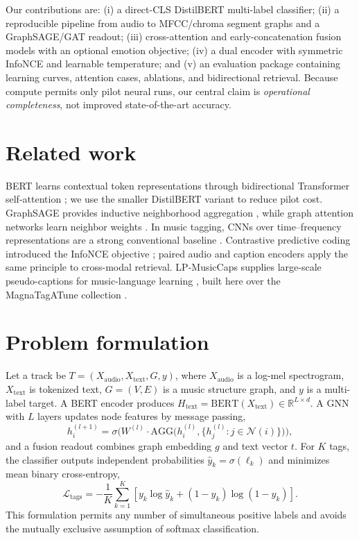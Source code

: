 \documentclass{article}
\begin{document}
Our contributions are: (i) a direct-CLS DistilBERT multi-label classifier;
(ii) a reproducible pipeline from audio to MFCC/chroma segment graphs and a
GraphSAGE/GAT readout; (iii) cross-attention and early-concatenation fusion
models with an optional emotion objective; (iv) a dual encoder with symmetric
InfoNCE and learnable temperature; and (v) an evaluation package containing
learning curves, attention cases, ablations, and bidirectional retrieval.
Because compute permits only pilot neural runs, our central claim is
\emph{operational completeness}, not improved state-of-the-art accuracy.

\section{Related work}
\label{sec:related}

BERT learns contextual token representations through bidirectional
Transformer self-attention \citep{devlin2019bert,vaswani2017attention}; we use
the smaller DistilBERT variant \citep{sanh2019distilbert} to reduce pilot
cost. GraphSAGE provides inductive neighborhood aggregation
\citep{hamilton2017graphsage}, while graph attention networks learn
neighbor weights \citep{velickovic2018gat}. In music tagging, CNNs over
time--frequency representations are a strong conventional baseline
\citep{choi2017convolutional}. Contrastive predictive coding introduced the
InfoNCE objective \citep{oord2018infonce}; paired audio and caption encoders
apply the same principle to cross-modal retrieval. LP-MusicCaps supplies
large-scale pseudo-captions for music-language learning
\citep{doh2023lpmusiccaps}, built here over the MagnaTagATune collection
\citep{law2009magnatagatune}.

\section{Problem formulation}
\label{sec:problem}

Let a track be $T = (X_{\text{audio}}, X_{\text{text}}, G, y)$, where
$X_{\text{audio}}$ is a log-mel spectrogram, $X_{\text{text}}$ is tokenized
text, $G = (V, E)$ is a music structure graph, and $y$ is a multi-label
target. A BERT encoder produces $H_{\text{text}} = \mathrm{BERT}(X_{\text{text}}) \in \mathbb{R}^{L \times d}$.
A GNN with $L$ layers updates node features by message passing,
\begin{equation}
h_i^{(l+1)} = \sigma\!\Big(W^{(l)} \cdot \mathrm{AGG}\big(h_i^{(l)}, \{h_j^{(l)} : j \in \mathcal{N}(i)\}\big)\Big),
\end{equation}
and a fusion readout combines graph embedding $g$ and text vector $t$.
For $K$ tags, the classifier outputs independent probabilities
$\hat y_k=\sigma(\ell_k)$ and minimizes mean binary cross-entropy,
\begin{equation}
\mathcal{L}_{\mathrm{tags}}=-\frac{1}{K}\sum_{k=1}^{K}
\left[y_k\log\hat y_k+(1-y_k)\log(1-\hat y_k)\right].
\end{equation}
This formulation permits any number of simultaneous positive labels and
avoids the mutually exclusive assumption of softmax classification.
\end{document}

